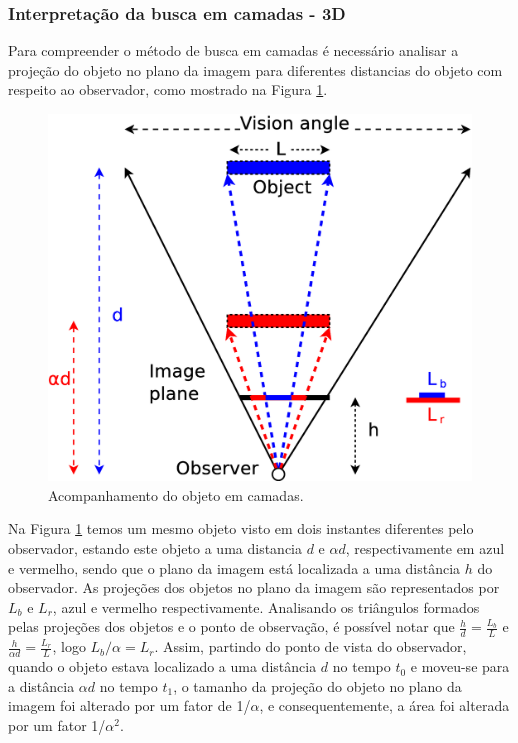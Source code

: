 

\subsubsection{Interpretação da busca em camadas - 3D}

Para compreender o método de busca em camadas é necessário analisar a projeção do objeto 
no plano da imagem para diferentes distancias do objeto com respeito ao observador, 
como mostrado na Figura \ref{fig:multiscale3d}.
\begin{figure}[H]
\centering
  \includegraphics[width=.7\columnwidth]{images/Diagrama3.eps}
  \caption{ Acompanhamento do objeto em camadas.}
  \label{fig:multiscale3d}
\end{figure}
Na Figura \ref{fig:multiscale3d} temos um mesmo objeto visto em dois instantes diferentes pelo observador,
estando este objeto a uma distancia $d$ e $\alpha d$, respectivamente em azul e vermelho, sendo que
o plano da imagem está localizada a uma distância $h$ do observador. As projeções dos objetos no plano da imagem
 são representados por $L_b$ e $L_r$, azul e vermelho respectivamente. 
 Analisando os triângulos formados pelas projeções dos objetos e o ponto de observação, 
 é possível notar que $\frac{h}{d}=\frac{L_b}{L}$ e $\frac{h}{\alpha d}=\frac{L_r}{L}$, logo 
$L_b/\alpha= L_r$. 
Assim, partindo do ponto de vista do observador, quando o objeto estava localizado a uma distância $d$ no tempo
$t_0$ e moveu-se para a distância $\alpha d$ no tempo $t_1$, o tamanho da projeção do objeto no plano da imagem 
foi alterado por um fator de 1/$\alpha$, e consequentemente, a área foi alterada por um fator 1/$\alpha^2$.

